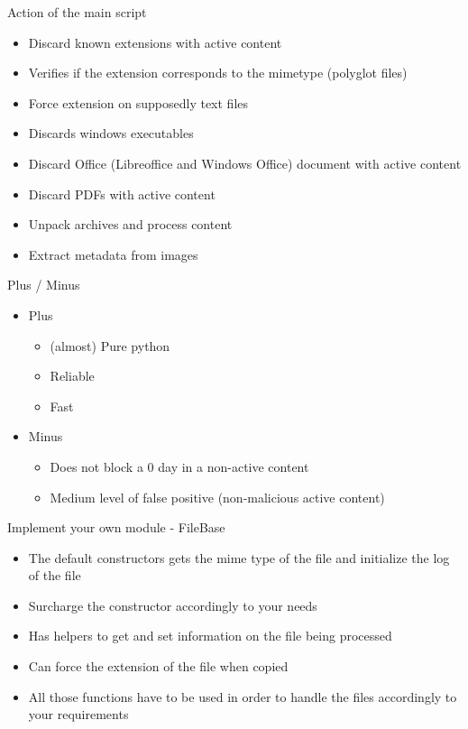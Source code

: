 \begin{frame}[fragile]{Action of the main script}
    \begin{itemize}
        \item Discard known extensions with active content
        \item Verifies if the extension corresponds to the mimetype (polyglot files)
        \item Force extension on supposedly text files
        \item Discards windows executables
        \item Discard Office (Libreoffice and Windows Office) document with active content
        \item Discard PDFs with active content
        \item Unpack archives and process content
        \item Extract metadata from images
   \end{itemize}
\end{frame}

\begin{frame}[fragile]{Plus / Minus}
    \begin{itemize}
        \item Plus
        \begin{itemize}
            \item (almost) Pure python
            \item Reliable
            \item Fast
        \end{itemize}
        \item Minus
        \begin{itemize}
            \item Does not block a 0 day in a non-active content
            \item Medium level of false positive (non-malicious active content)
        \end{itemize}
   \end{itemize}
\end{frame}

\begin{frame}[fragile]{Implement your own module - FileBase}
    \begin{itemize}
        \item The default constructors gets the mime type of the file and initialize the log of the file
        \item Surcharge the constructor accordingly to your needs
        \item Has helpers to get and set information on the file being processed
        \item Can force the extension of the file when copied
        \item All those functions have to be used in order to handle the files accordingly to your requirements
   \end{itemize}
\end{frame}

